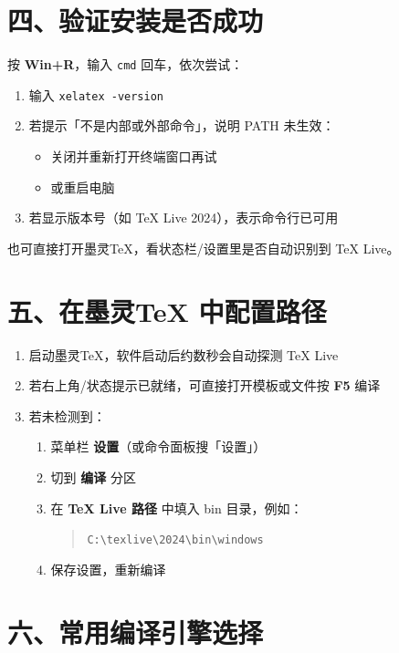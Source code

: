 \documentclass[UTF8,11pt]{article}
\begin{document}
\section*{四、验证安装是否成功}
按 \textbf{Win+R}，输入 \texttt{cmd} 回车，依次尝试：

\begin{enumerate}
  \item 输入 \texttt{xelatex -version}
  \item 若提示「不是内部或外部命令」，说明 PATH 未生效：
    \begin{itemize}
      \item 关闭并重新打开终端窗口再试
      \item 或重启电脑
    \end{itemize}
  \item 若显示版本号（如 TeX Live 2024），表示命令行已可用
\end{enumerate}

也可直接打开墨灵TeX，看状态栏/设置里是否自动识别到 TeX Live。

\section*{五、在墨灵TeX 中配置路径}

\begin{enumerate}
  \item 启动墨灵TeX，软件启动后约数秒会自动探测 TeX Live
  \item 若右上角/状态提示已就绪，可直接打开模板或文件按 \textbf{F5} 编译
  \item 若未检测到：
    \begin{enumerate}
      \item 菜单栏 \textbf{设置}（或命令面板搜「设置」）
      \item 切到 \textbf{编译} 分区
      \item 在 \textbf{TeX Live 路径} 中填入 bin 目录，例如：
\begin{quote}
\texttt{C:\textbackslash texlive\textbackslash 2024\textbackslash bin\textbackslash windows}
\end{quote}
      \item 保存设置，重新编译
    \end{enumerate}
\end{enumerate}

\section*{六、常用编译引擎选择}
\end{document}

